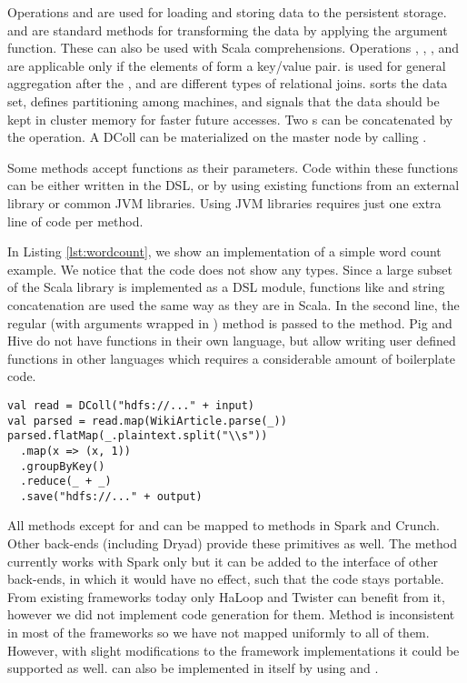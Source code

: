 Operations  and  are used for loading and storing data
to the persistent storage.  and  are standard
methods for transforming the data by applying the argument function. These can
also be used with Scala  comprehensions. Operations
, , ,  and 
are applicable only if the elements of  form a key/value pair.
 is used for general aggregation after the ,
 and  are different types of relational joins.
 sorts the data set,  defines partitioning among
machines, and  signals that the data should be kept in cluster
memory for faster future accesses. Two s can be concatenated by the
\code{++} operation. A DColl can be materialized on the master node by calling
.

Some methods accept functions as their parameters. Code within these functions
can be either written in the \tool DSL, or by using existing functions from an
external library or common JVM libraries. Using JVM libraries requires just one
extra line of code per method.

In Listing \ref{lst:wordcount}, we show an implementation of a simple word count
example. We notice that the code does not show any  types.
Since a large subset of the Scala library is implemented as a DSL module, functions like
 and string concatenation are used the same way as they are in
Scala. In the second line, the regular (with arguments wrapped in )
method  is passed to the  method. Pig and Hive do not have
functions in their own language, but allow writing user defined functions in
other languages which requires a considerable amount of boilerplate code.

\begin{lstlisting}[name=code, caption=An example of a simple word count
program., captionpos=b, label=lst:wordcount, float=t] 
val read = DColl("hdfs://..." + input)
val parsed = read.map(WikiArticle.parse(_))
parsed.flatMap(_.plaintext.split("\\s"))
  .map(x => (x, 1))
  .groupByKey()
  .reduce(_ + _)
  .save("hdfs://..." + output)
\end{lstlisting}

All methods except for  and  can be mapped to methods in
Spark and Crunch. Other back-ends (including Dryad) provide these
primitives as well. The  method currently works with Spark only but
it can be added to the interface of other back-ends, in which it would have no
effect, such that the code stays portable. From existing frameworks today only
HaLoop \cite{bu_haloop:_2010} and Twister \cite{ekanayake_twister:_2010} can
benefit from it, however we did not implement code generation for them. Method
 is inconsistent in most of the frameworks so we have not mapped
uniformly to all of them. However, with slight modifications to the framework
implementations it could be supported as well.  can also be
implemented in \tool itself by using  and .
